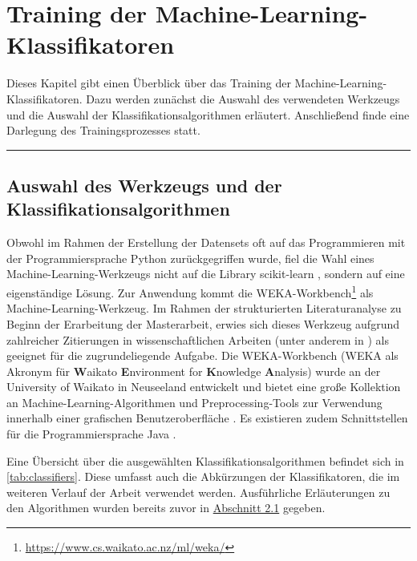 
\chapter{Training der Machine-Learning-Klassifikatoren}
\label{training}

Dieses Kapitel gibt einen Überblick über das Training der Machine-Learning-Klassifikatoren. Dazu werden zunächst die Auswahl des verwendeten Werkzeugs und die Auswahl der Klassifikationsalgorithmen erläutert. Anschließend finde eine Darlegung des Trainingsprozesses statt.
\\
\hrule

\section{Auswahl des Werkzeugs und der Klassifikationsalgorithmen}

Obwohl im Rahmen der Erstellung der Datensets oft auf das Programmieren mit der Programmiersprache Python zurückgegriffen wurde, fiel die Wahl eines Machine-Learning-Werkzeugs nicht auf die Library scikit-learn \cite{scikit}, sondern auf eine eigenständige Lösung. Zur Anwendung kommt die WEKA-Workbench\footnote{\href{https://www.cs.waikato.ac.nz/ml/weka/}{https://www.cs.waikato.ac.nz/ml/weka/}} als Machine-Learning-Werkzeug. Im Rahmen der strukturierten Literaturanalyse zu Beginn der Erarbeitung der Masterarbeit, erwies sich dieses Werkzeug aufgrund zahlreicher Zitierungen in wissenschaftlichen Arbeiten (unter anderem in \cite{Hammouri2018,Queiroz2016,Ratzinger2008}) als geeignet für die zugrundeliegende Aufgabe. Die WEKA-Workbench (WEKA als Akronym für \textbf{W}aikato \textbf{E}nvironment for \textbf{K}nowledge \textbf{A}nalysis) wurde an der University of Waikato in Neuseeland entwickelt und bietet eine große Kollektion an Machine-Learning-Algorithmen und Preprocessing-Tools zur Verwendung innerhalb einer grafischen Benutzeroberfläche \cite{Weka2016}. Es existieren zudem Schnittstellen für die Programmiersprache Java \cite{Weka2016}.

Eine Übersicht über die ausgewählten Klassifikationsalgorithmen befindet sich in \autoref{tab:classifiers}. Diese umfasst auch die Abkürzungen der Klassifikatoren, die im weiteren Verlauf der Arbeit verwendet werden. Ausführliche Erläuterungen zu den Algorithmen wurden bereits zuvor in \hyperref[algorithms]{Abschnitt 2.1} gegeben.

